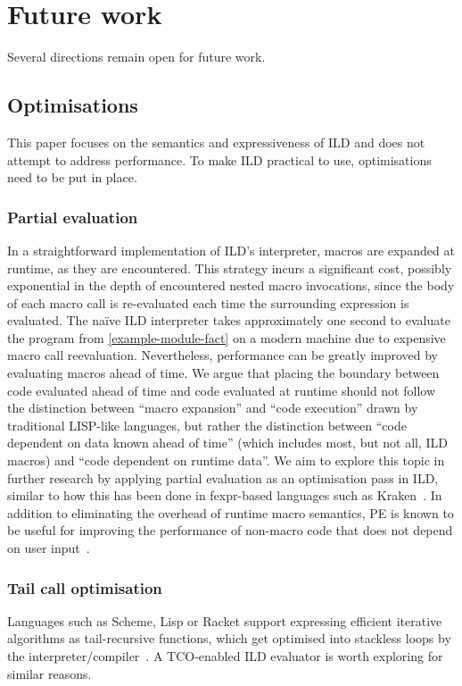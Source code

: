 \section{Future work}
\label{future-work}
Several directions remain open for future work.
\subsection{Optimisations}
This paper focuses on the semantics and expressiveness of ILD and does not attempt
to address performance. To make ILD practical to use, optimisations need to be
put in place.
\subsubsection{Partial evaluation}
In a straightforward implementation of ILD's interpreter, macros are expanded at runtime,
as they are encountered.
This strategy incurs a significant cost, possibly exponential in the depth
of encountered nested macro invocations, since the body of each macro call
is re-evaluated each time the surrounding expression is evaluated. The naïve
ILD interpreter takes approximately one second to evaluate the program from \cref{example-module-fact}
on a modern machine due to expensive macro call reevaluation.
Nevertheless, performance can be greatly improved by evaluating macros ahead of time.
We argue that placing the boundary between code evaluated ahead of time and code
evaluated at runtime should not
follow the distinction between ``macro expansion'' and
``code execution'' drawn by traditional LISP-like languages, but rather the
distinction between ``code dependent on data known ahead of time''
(which includes most, but not all, ILD macros) and ``code dependent on runtime data''.
We aim to explore this topic in further research by applying partial evaluation
as an optimisation pass in ILD, similar to how this has been done in fexpr-based languages
such as Kraken~\cite{fexpr-pe}. In addition to eliminating the overhead
of runtime macro semantics, PE is known to be useful for improving the performance of
non-macro code that does not depend on user input~\cite{anydsl}.
\subsubsection{Tail call optimisation}
Languages such as Scheme, Lisp or Racket support expressing efficient iterative
algorithms as tail-recursive functions, which get optimised into stackless loops
by the interpreter/compiler~\cite{clinger-tail-recursion}. A TCO-enabled ILD evaluator
is worth exploring for similar reasons.
